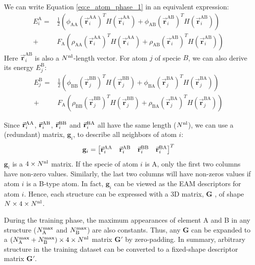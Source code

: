 \documentclass[prb,reprint,superscriptaddress]{revtex4-2}
\begin{document}
We can write Equation \ref{eq:e_atom_phase_1} in an equivalent expression:
\begin{align}
E_{i}^{\mathrm{A}} 
\label{eq:e_atom_A}
= &
\frac{1}{2}\left( 
    \phi_{\mathrm{AA}}(\vec{\mathbf{r}}_{i}^{\mathrm{AA}})^T
    H(\vec{\mathbf{r}}_{i}^{\mathrm{AA}}) +
    \phi_{\mathrm{AB}}(\vec{\mathbf{r}}_{i}^{\mathrm{AB}})^T
    H(\vec{\mathbf{r}}_{i}^{\mathrm{AB}})
\right) \nonumber \\
+ &
F_{\mathrm{A}}\left( 
    \rho_{\mathrm{AA}}(\vec{\mathbf{r}}_{i}^{\mathrm{AA}})^T
    H(\vec{\mathbf{r}}_{i}^{\mathrm{AA}}) +
    \rho_{\mathrm{AB}}(\vec{\mathbf{r}}_{i}^{\mathrm{AB}})^T
    H(\vec{\mathbf{r}}_{i}^{\mathrm{AB}})
\right)
\end{align}
Here $\vec{\mathbf{r}}_{i}^{\mathrm{AB}}$ is also a $N^{\mathrm{nl}}$-length vector. For 
atom $j$ of specie $B$, we can also derive its energy $E^{\mathrm{B}}_{j}$:
\begin{align}
E_{j}^{\mathrm{B}}
\label{eq:e_atom_B}
= &
\frac{1}{2}\left( 
    \phi_{\mathrm{BB}}(\vec{\mathbf{r}}_{j}^{\mathrm{BB}})^T
    H(\vec{\mathbf{r}}_{j}^{\mathrm{BB}}) +
    \phi_{\mathrm{BA}}(\vec{\mathbf{r}}_{j}^{\mathrm{BA}})^T
    H(\vec{\mathbf{r}}_{j}^{\mathrm{BA}})
\right) \nonumber \\
+ &
F_{\mathrm{A}}\left( 
    \rho_{\mathrm{BB}}(\vec{\mathbf{r}}_{j}^{\mathrm{BB}})^T
    H(\vec{\mathbf{r}}_{j}^{\mathrm{BB}}) +
    \rho_{\mathrm{BA}}(\vec{\mathbf{r}}_{j}^{\mathrm{BA}})^T
    H(\vec{\mathbf{r}}_{j}^{\mathrm{BA}})
\right)
\end{align}

Since $\vec{\mathbf{r}}_{i}^{\mathrm{AA}}$, $\vec{\mathbf{r}}_{i}^{\mathrm{AB}}$, $\vec{\mathbf{r}}_{i}^{\mathrm{BB}}$ and $\vec{\mathbf{r}}_{i}^{\mathrm{BA}}$ all have the same length ($N^{\mathrm{nl}}$), 
we can use a (redundant) matrix, $\mathbf{g}_{i}$, to describe all neighbors of 
atom $i$:
\begin{equation}
\mathbf{g}_i = \begin{bmatrix}
    \vec{\mathbf{r}}_{i}^{\mathrm{AA}} & \vec{\mathbf{r}}_{i}^{\mathrm{AB}} & \vec{\mathbf{r}}_{i}^{\mathrm{BB}} & \vec{\mathbf{r}}_{i}^{\mathrm{BA}} \\
\end{bmatrix}^T
\end{equation}
$\mathbf{g}_i$ is a $4 \times N^{\mathrm{nl}}$ matrix. If the specie of atom $i$ is A, only
the first two columns have non-zero values. Similarly, the last two columns will
have non-zeros values if atom $i$ is a B-type atom. In fact, $\mathbf{g}_i$ can
be viewed as the EAM descriptors for atom $i$. Hence, each structure can be 
expressed with a 3D matrix, $\mathbf{G}$ , of shape $N \times 4 \times N^{\mathrm{nl}}$.

During the training phase, the maximum appearances of element A and B in any 
structure ($N_{\mathrm{A}}^{\mathrm{max}}$ and $N_{\mathrm{B}}^{\mathrm{max}}$) are also constants. Thus, any $\mathbf{G}$ can 
be expanded to a $(N_{\mathrm{A}}^{\mathrm{max}} + N_{\mathrm{B}}^{\mathrm{max}}) \times 4 \times N^{\mathrm{nl}}$ matrix $\mathbf{G}'$ 
by zero-padding. In summary, arbitrary structure in the training dataset can be 
converted to a fixed-shape descriptor matrix $\mathbf{G}'$. 
\end{document}
